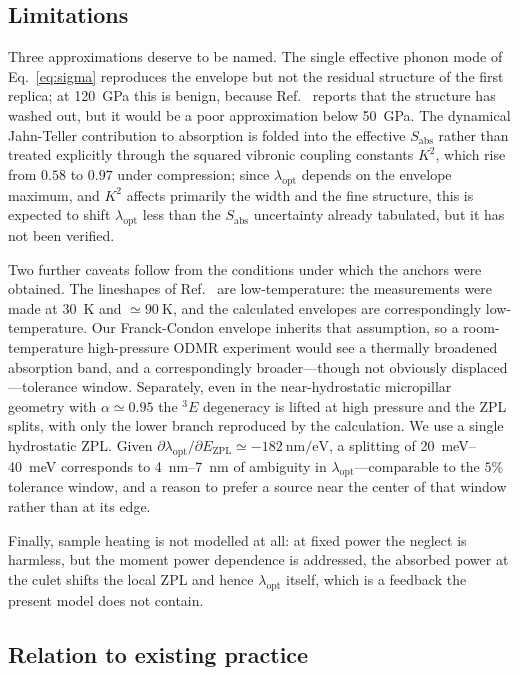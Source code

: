\documentclass[preprint,12pt]{elsarticle}
\newcommand{\esE}{\ensuremath{^{3}\!E}}
\newcommand{\lopt}{\ensuremath{\lambda_{\mathrm{opt}}}}
\begin{document}
\subsection{Limitations}

Three approximations deserve to be named. The single effective phonon mode of
Eq.~\eqref{eq:sigma} reproduces the envelope but not the residual structure of
the first replica; at \SI{120}{\giga\pascal} this is benign, because
Ref.~\cite{Ho2026} reports that the structure has washed out, but it would be a
poor approximation below \SI{50}{\giga\pascal}. The dynamical Jahn-Teller
contribution to absorption is folded into the effective $S_{\mathrm{abs}}$ rather
than treated explicitly through the squared vibronic coupling constants $K^2$,
which rise from $0.58$ to $0.97$ under compression; since $\lopt$ depends on the
envelope maximum, and $K^2$ affects primarily the width and the fine structure,
this is expected to shift $\lopt$ less than the $S_{\mathrm{abs}}$ uncertainty
already tabulated, but it has not been verified.

Two further caveats follow from the conditions under which the anchors were
obtained. The lineshapes of Ref.~\cite{Ho2026} are low-temperature: the
measurements were made at \SI{30}{\kelvin} and $\simeq\SI{90}{\kelvin}$, and
the calculated envelopes are correspondingly low-temperature. Our Franck-Condon
envelope inherits that assumption, so a room-temperature high-pressure ODMR
experiment would see a thermally broadened absorption band, and a correspondingly
broader---though not obviously displaced---tolerance window. Separately, even in
the near-hydrostatic micropillar geometry with $\alpha \simeq 0.95$ the \esE{}
degeneracy is lifted at high pressure and the ZPL splits, with only the lower
branch reproduced by the calculation. We use a single hydrostatic ZPL. Given
$\partial\lopt/\partial E_{\mathrm{ZPL}} \simeq
\SI{-182}{\nano\meter\per\electronvolt}$, a splitting of
\SIrange{20}{40}{\milli\electronvolt} corresponds to
\SIrange{4}{7}{\nano\meter} of ambiguity in $\lopt$---comparable to the $5\%$
tolerance window, and a reason to prefer a source near the center of that window
rather than at its edge.

Finally, sample heating is not modelled at all: at fixed power the neglect is
harmless, but the moment power dependence is addressed, the absorbed power at the
culet shifts the local ZPL and hence $\lopt$ itself, which is a feedback the
present model does not contain.

\subsection{Relation to existing practice}
\end{document}
